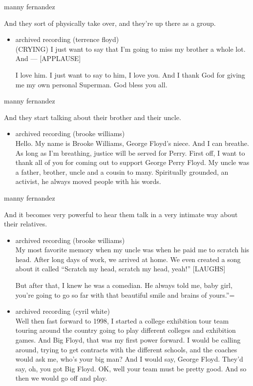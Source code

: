 manny fernandez

And they sort of physically take over, and they're up there as a group.

\begin{itemize}
\item
  archived recording (terrence floyd)\\
  (CRYING) I just want to say that I'm going to miss my brother a whole
  lot. And --- {[}APPLAUSE{]}

  I love him. I just want to say to him, I love you. And I thank God for
  giving me my own personal Superman. God bless you all.
\end{itemize}

manny fernandez

And they start talking about their brother and their uncle.

\begin{itemize}
\tightlist
\item
  archived recording (brooke williams)\\
  Hello. My name is Brooke Williams, George Floyd's niece. And I can
  breathe. As long as I'm breathing, justice will be served for Perry.
  First off, I want to thank all of you for coming out to support George
  Perry Floyd. My uncle was a father, brother, uncle and a cousin to
  many. Spiritually grounded, an activist, he always moved people with
  his words.
\end{itemize}

manny fernandez

And it becomes very powerful to hear them talk in a very intimate way
about their relatives.

\begin{itemize}
\item
  archived recording (brooke williams)\\
  My most favorite memory when my uncle was when he paid me to scratch
  his head. After long days of work, we arrived at home. We even created
  a song about it called ``Scratch my head, scratch my head, yeah!''
  {[}LAUGHS{]}

  But after that, I knew he was a comedian. He always told me, baby
  girl, you're going to go so far with that beautiful smile and brains
  of yours.''=
\item
  archived recording (cyril white)\\
  Well then fast forward to 1998, I started a college exhibition tour
  team touring around the country going to play different colleges and
  exhibition games. And Big Floyd, that was my first power forward. I
  would be calling around, trying to get contracts with the different
  schools, and the coaches would ask me, who's your big man? And I would
  say, George Floyd. They'd say, oh, you got Big Floyd. OK, well your
  team must be pretty good. And so then we would go off and play.
\end{itemize}

